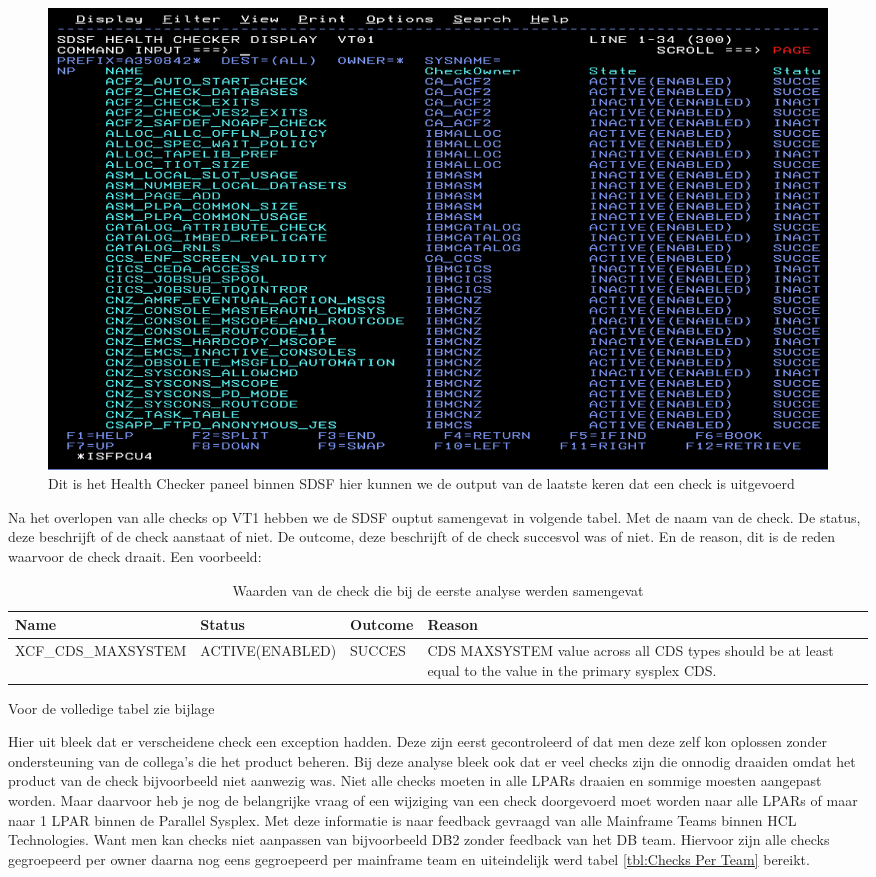\begin{figure}[h]
	\centering
	\includegraphics[width=0.7\linewidth]{img/SDSFCK}
	\caption[Health Checker Scherm binnen SDSF]{Dit is het Health Checker paneel binnen SDSF hier kunnen we de output van de laatste keren dat een check is uitgevoerd}
	\label{fig:sdsfck}
\end{figure}


Na het overlopen van alle checks op VT1 hebben we de SDSF ouptut samengevat in volgende tabel. Met de naam van de check. De status, deze beschrijft of de check aanstaat of niet. De outcome, deze beschrijft of de check succesvol was of niet. En de reason, dit is de reden waarvoor de check draait. Een voorbeeld:
\begin{table}[]
	\begin{tabular}{|p{5cm}|p{3.5cm}|p{1.5cm}|p{5cm}|}
		\hline
		\textbf{Name} & \textbf{Status} & \textbf{Outcome} & \textbf{Reason} \\
		\hline
		XCF\_CDS\_MAXSYSTEM & ACTIVE(ENABLED) & SUCCES & CDS MAXSYSTEM value across all CDS types should be at least equal to the value 
		in the primary sysplex CDS.  \\
		\hline
	\end{tabular}
	\caption[Individuele check]{Waarden van de check die bij de eerste analyse werden samengevat}
	\label{tbl:Individuele check}
\end{table}


Voor de volledige tabel zie bijlage 

Hier uit bleek dat er verscheidene check een exception hadden. Deze zijn eerst gecontroleerd of dat men deze zelf kon oplossen zonder ondersteuning van de collega's die het product beheren. Bij deze analyse bleek ook dat er veel checks zijn die onnodig draaiden omdat het product van de check bijvoorbeeld niet aanwezig was. Niet alle checks moeten in alle LPARs draaien en sommige moesten aangepast worden. Maar daarvoor heb je nog de belangrijke vraag of een wijziging van een check doorgevoerd moet worden naar alle LPARs of maar naar 1 LPAR binnen de Parallel Sysplex. Met deze informatie is naar feedback gevraagd van alle Mainframe Teams binnen HCL Technologies. Want men kan checks niet aanpassen van bijvoorbeeld DB2 zonder feedback van het DB team. Hiervoor zijn alle checks gegroepeerd per owner daarna nog eens gegroepeerd per mainframe team en uiteindelijk werd tabel \ref{tbl:Checks Per Team} bereikt.

